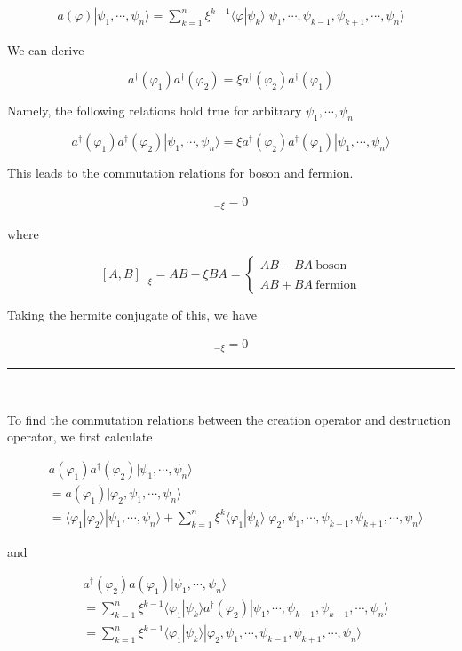 \begin{align}\label{Eqs1.6.2}a(\varphi)|\psi_1,\cdots,\psi_n\rangle = \sum_{k=1}^n \xi^{k-1}\langle \varphi|\psi_k\rangle |\psi_1,\cdots,\psi_{k-1},\psi_{k+1},\cdots,\psi_n\rangle \end{align}


We can derive 

\[a^\dagger(\varphi_1)a^\dagger(\varphi_2) = \xi a^\dagger(\varphi_2)a^\dagger(\varphi_1) \]

Namely, the following relations hold true for arbitrary $\psi_1,\cdots,\psi_n$

\[a^\dagger(\varphi_1)a^\dagger(\varphi_2)|\psi_1,\cdots,\psi_n\rangle = \xi a^\dagger(\varphi_2)a^\dagger(\varphi_1) |\psi_1,\cdots,\psi_n\rangle\]

This leads to the commutation relations for boson and fermion. 

\begin{align}
[a^\dagger(\varphi_1),a^\dagger(\varphi_2)]_{-\xi} = 0
\end{align}

where

\[[A,B]_{-\xi} = AB - \xi BA = \begin{cases}AB-BA\ \text{boson}\\ \ \\ AB+BA \ \text{fermion}\end{cases}\]

Taking the hermite conjugate of this, we have

\begin{align}
[a(\varphi_1),a(\varphi_2)]_{-\xi} = 0
\end{align}

\hrule

\ 

To find the commutation relations between the creation operator and destruction operator, we first calculate 

\[\begin{split}
&a(\varphi_1)a^\dagger(\varphi_2)|\psi_1,\cdots,\psi_n\rangle \\
&=a(\varphi_1)|\varphi_2,\psi_1,\cdots,\psi_n\rangle\\
&= \langle\varphi_1|\varphi_2\rangle|\psi_1,\cdots,\psi_n\rangle + \sum_{k=1}^n\xi^k\langle\varphi_1|\psi_k\rangle|\varphi_2,\psi_1,\cdots,\psi_{k-1},\psi_{k+1},\cdots,\psi_n\rangle
\end{split}\]

and

\[\begin{split}
&a^\dagger(\varphi_2)a(\varphi_1)|\psi_1,\cdots,\psi_n\rangle \\
&= \sum_{k=1}^n\xi^{k-1}\langle \varphi_1|\psi_k\rangle a^\dagger(\varphi_2)|\psi_1,\cdots,\psi_{k-1},\psi_{k+1},\cdots,\psi_n\rangle\\
&= \sum_{k=1}^n\xi^{k-1}\langle \varphi_1|\psi_k\rangle |\varphi_2,\psi_1,\cdots,\psi_{k-1},\psi_{k+1},\cdots,\psi_n\rangle\\
\end{split}\]

